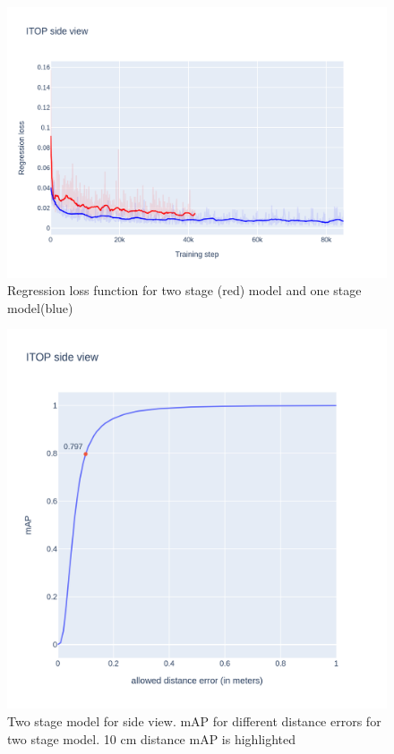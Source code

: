 \begin{figure}[htbp]
    \centerline{\includegraphics[scale=0.15]{Figures/one-stage-vs-two-stage-regression.png}}
    \caption{Regression loss function for two stage (red) model and one stage model(blue)}
    \label{img:one-stage-vs-two-stage-regression}
\end{figure}

\begin{figure}[htbp]
    \centerline{\includegraphics[trim=50 100 50 100,clip,scale=0.15]{Figures/two-stage-map.png}}
    \caption{Two stage model for side view. mAP for different distance errors for two stage model. 10 cm distance mAP is highlighted}
    \label{img:two-stage-map}
\end{figure}

